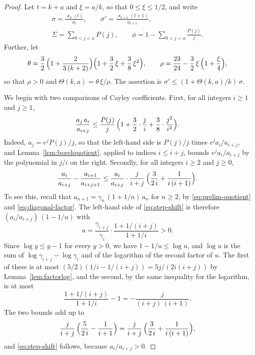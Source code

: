 \documentclass{amsart}
\theoremstyle{definition}
\theoremstyle{remark}
\numberwithin{equation}{section}
\begin{document}
\begin{proof}
Let $t=k+a$ and $\xi=a/k$, so that $0\le\xi\le1/2$, and write
\begin{gather*}
\sigma=\frac{\varkappa_k(t)}{a_t},\qquad
\sigma'=\frac{\varkappa_{k+1}(t+1)}{a_{t+1}},\\
\Sigma=\sum_{0<j<a}P(j),\qquad
\phi=1-\sum_{0<j<a}\frac{P(j)}{j}.
\end{gather*}
Further, let
\[
\theta=\frac32\,\Bigl(1+\frac{2}{3\,(k+2)}\Bigr)
\Bigl(1+\frac32\,\xi+\frac38\,\xi^2\Bigr),\qquad
\rho=\frac{23}{24}-\frac32\,\xi\,\Bigl(1+\frac{\xi}{4}\Bigr),
\]
so that $\rho>0$ and $\Theta(k,a)=\theta\,\xi/\rho$. The assertion is
$\sigma'\le(1+\Theta(k,a)/k)\,\sigma$.

We begin with two comparisons of Cayley coefficients. First, for all
integers $i\ge1$ and $j\ge1$,
\begin{equation}\label{eq:step-borel}
\frac{a_j\,a_i}{a_{i+j}}\le\frac{P(j)}{j}\,
\Bigl(1+\frac32\cdot\frac{j}{i}+\frac38\cdot\frac{j^2}{i^2}\Bigr).
\end{equation}
Indeed, $a_j=e^{j}P(j)/j$, so that the left-hand side is $P(j)/j$ times
$e^{j}a_i/a_{i+j}$, and Lemma~\ref{lem:borelquotient}, applied to indices
$i\le i+j$, bounds $e^{j}a_i/a_{i+j}$ by the polynomial in $j/i$ on
the right. Secondly, for all integers $i\ge2$ and $j\ge0$,
\begin{equation}\label{eq:step-shift}
\frac{a_i}{a_{i+j}}-\frac{a_{i+1}}{a_{i+j+1}}\le\frac{a_i}{a_{i+j}}\cdot
\frac{j}{i+j}\,\Bigl(\frac{3}{2\,i}+\frac{1}{i\,(i+1)}\Bigr).
\end{equation}
To see this, recall that $a_{n+1}=\gamma_n\,(1+1/n)\,a_n$ for $n\ge2$, by
\eqref{eq:prelim-quotient} and \eqref{eq:diagonal-factor}. The left-hand
side of \eqref{eq:step-shift} is therefore $(a_i/a_{i+j})\,(1-1/u)$ with
\[
u=\frac{\gamma_{i+j}}{\gamma_i}\cdot\frac{1+1/(i+j)}{1+1/i}>0 .
\]
Since $\log y\le y-1$ for every $y>0$, we have $1-1/u\le\log u$, and
$\log u$ is the sum of $\log\gamma_{i+j}-\log\gamma_i$ and of the logarithm
of the second factor of $u$. The first of these is at most
$(5/2)(1/i-1/(i+j))=5j/(2i(i+j))$ by Lemma~\ref{lem:factorlog}, and the
second, by the same inequality for the logarithm, is at most
\[
\frac{1+1/(i+j)}{1+1/i}-1=-\frac{j}{(i+j)\,(i+1)} .
\]
The two bounds add up to
\[
\frac{j}{i+j}\,\Bigl(\frac{5}{2\,i}-\frac{1}{i+1}\Bigr)
=\frac{j}{i+j}\,\Bigl(\frac{3}{2\,i}+\frac{1}{i\,(i+1)}\Bigr),
\]
and \eqref{eq:step-shift} follows, because $a_i/a_{i+j}>0$.


\end{proof}
\end{document}
